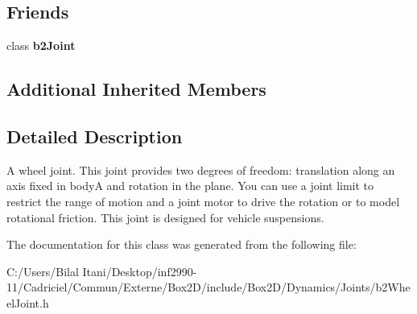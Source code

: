 \subsection*{Friends}
\begin{DoxyCompactItemize}
\item 
class {\bfseries b2\+Joint}\hypertarget{classb2_wheel_joint_a54ade8ed3d794298108d7f4c4e4793fa}{}\label{classb2_wheel_joint_a54ade8ed3d794298108d7f4c4e4793fa}

\end{DoxyCompactItemize}
\subsection*{Additional Inherited Members}


\subsection{Detailed Description}
A wheel joint. This joint provides two degrees of freedom\+: translation along an axis fixed in bodyA and rotation in the plane. You can use a joint limit to restrict the range of motion and a joint motor to drive the rotation or to model rotational friction. This joint is designed for vehicle suspensions. 

The documentation for this class was generated from the following file\+:\begin{DoxyCompactItemize}
\item 
C\+:/\+Users/\+Bilal Itani/\+Desktop/inf2990-\/11/\+Cadriciel/\+Commun/\+Externe/\+Box2\+D/include/\+Box2\+D/\+Dynamics/\+Joints/b2\+Wheel\+Joint.\+h\end{DoxyCompactItemize}

